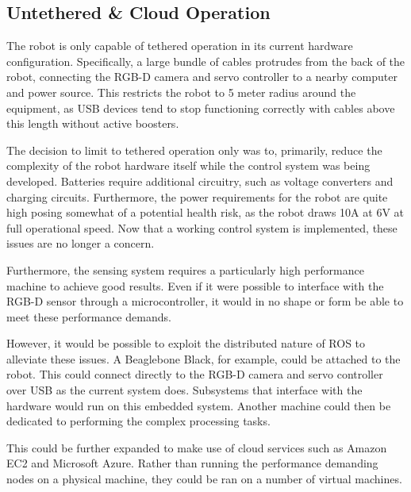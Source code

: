 \subsection{Untethered \& Cloud Operation}
The robot is only capable of tethered operation in its current hardware configuration. Specifically, a large bundle of cables protrudes from the back of the robot, connecting the RGB-D camera and servo controller to a nearby computer and power source. This restricts the robot to 5 meter radius around the equipment, as USB devices tend to stop functioning correctly with cables above this length without active boosters. 

The decision to limit to tethered operation only was to, primarily, reduce the complexity of the robot hardware itself while the control system was being developed. Batteries require additional circuitry, such as voltage converters and charging circuits. Furthermore, the power requirements for the robot are quite high posing somewhat of a potential health risk, as the robot draws 10A at 6V at full operational speed. Now that a working control system is implemented, these issues are no longer a concern.

Furthermore, the sensing system requires a particularly high performance machine to achieve good results. Even if it were possible to interface with the RGB-D sensor through a microcontroller, it would in no shape or form be able to meet these performance demands.

However, it would be possible to exploit the distributed nature of ROS to alleviate these issues. A Beaglebone Black, for example, could be attached to the robot. This could connect directly to the RGB-D camera and servo controller over USB as the current system does. Subsystems that interface with the hardware would run on this embedded system. Another machine could then be dedicated to performing the complex processing tasks.

This could be further expanded to make use of cloud services such as Amazon EC2 and Microsoft Azure. Rather than running the performance demanding nodes on a physical machine, they could be ran on a number of virtual machines. 